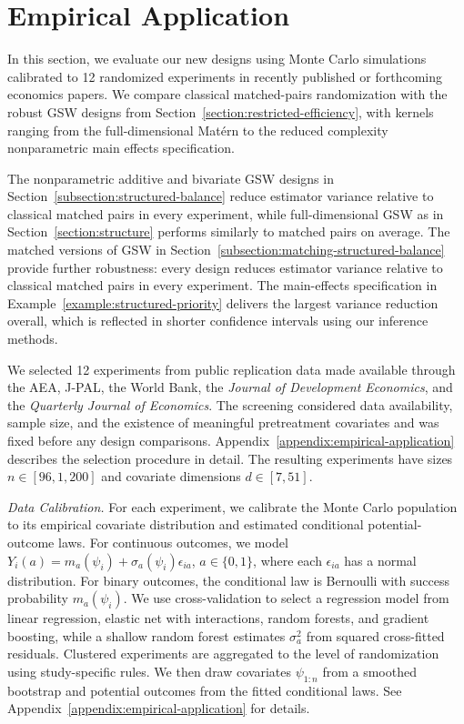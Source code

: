 \documentclass[letterpaper,12pt]{article}
\theoremstyle{definition}
\numberwithin{equation}{section}
\begin{document}

\section{Empirical Application}\label{section:empirical-application}

In this section, we evaluate our new designs using Monte Carlo simulations calibrated to 12 randomized experiments in recently published or forthcoming economics papers.
We compare classical matched-pairs randomization with the robust GSW designs from Section~\ref{section:restricted-efficiency}, with kernels ranging from the full-dimensional Mat\'ern to the reduced complexity nonparametric main effects specification.

The nonparametric additive and bivariate GSW designs in Section~\ref{subsection:structured-balance} reduce estimator variance relative to classical matched pairs in every experiment, while full-dimensional GSW as in Section~\ref{section:structure} performs similarly to matched pairs on average.
The matched versions of GSW in Section~\ref{subsection:matching-structured-balance} provide further robustness: every design reduces estimator variance relative to classical matched pairs in every experiment.
The main-effects specification in Example~\ref{example:structured-priority} delivers the largest variance reduction overall, which is reflected in shorter confidence intervals using our inference methods.

We selected 12 experiments from public replication data made available through the AEA, J-PAL, the World Bank, the \emph{Journal of Development Economics}, and the \emph{Quarterly Journal of Economics}.
The screening considered data availability, sample size, and the existence of meaningful pretreatment covariates and was fixed before any design comparisons.
Appendix~\ref{appendix:empirical-application} describes the selection procedure in detail.
The resulting experiments have sizes $n\in[96,1{,}200]$ and covariate dimensions $d\in[7,51]$.

\emph{Data Calibration.} For each experiment, we calibrate the Monte Carlo population to its empirical covariate distribution and estimated conditional potential-outcome laws.
For continuous outcomes, we model $Y_i(a)=m_a(\psi_i)+\sigma_a(\psi_i)\epsilon_{ia}$, $a\in\{0,1\}$, where each $\epsilon_{ia}$ has a normal distribution.
For binary outcomes, the conditional law is Bernoulli with success probability $m_a(\psi_i)$.
We use cross-validation to select a regression model from linear regression, elastic net with interactions, random forests, and gradient boosting, while a shallow random forest estimates $\sigma_a^2$ from squared cross-fitted residuals.
Clustered experiments are aggregated to the level of randomization using study-specific rules.
We then draw covariates $\psi_{1:n}$ from a smoothed bootstrap and potential outcomes from the fitted conditional laws.
See Appendix~\ref{appendix:empirical-application} for details.
\end{document}
